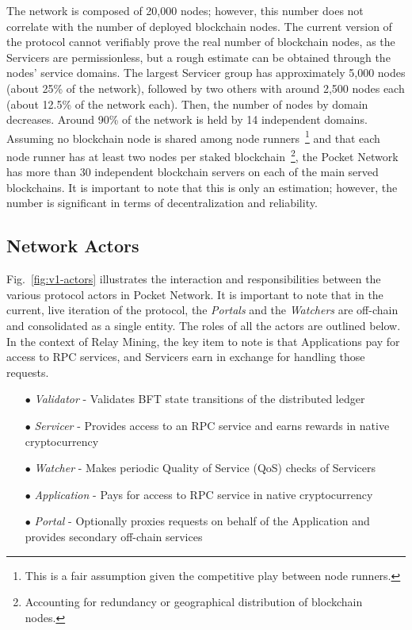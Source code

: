 \documentclass[runningheads]{llncs}
\begin{document}
The network is composed of 20,000 nodes; however, this number does not correlate with the number of deployed blockchain nodes. The current version of the protocol cannot verifiably prove the real number of blockchain nodes, as the Servicers are permissionless, but a rough estimate can be obtained through the nodes' service domains. The largest Servicer group has approximately 5,000 nodes (about 25\% of the network), followed by two others with around 2,500 nodes each (about 12.5\% of the network each). Then, the number of nodes by domain decreases. Around 90\% of the network is held by 14 independent domains. Assuming no blockchain node is shared among node runners~\footnote{This is a fair assumption given the competitive play between node runners.} and that each node runner has at least two nodes per staked blockchain~\footnote{Accounting for redundancy or geographical distribution of blockchain nodes.}, the Pocket Network has more than 30 independent blockchain servers on each of the main served blockchains. It is important to note that this is only an estimation; however, the number is significant in terms of decentralization and reliability.

\subsection{Network Actors}

Fig.~\ref{fig:v1-actors} illustrates the interaction and responsibilities between the various protocol actors in Pocket Network. It is important to note that in the current, live iteration of the protocol, the \textit{Portals} and the \textit{Watchers} are off-chain and consolidated as a single entity. The roles of all the actors are outlined below. In the context of Relay Mining, the key item to note is that Applications pay for access to RPC services, and Servicers earn in exchange for handling those requests.

\begin{itemize}
    \item[$\bullet$] \textit{Validator} - Validates BFT state transitions of the distributed ledger
    \item[$\bullet$] \textit{Servicer} - Provides access to an RPC service and earns rewards in native cryptocurrency
    \item[$\bullet$] \textit{Watcher} - Makes periodic Quality of Service (QoS) checks of Servicers
    \item[$\bullet$] \textit{Application} - Pays for access to RPC service in native cryptocurrency
    \item[$\bullet$] \textit{Portal} - Optionally proxies requests on behalf of the Application and provides secondary off-chain services
\end{itemize}
\end{document}
